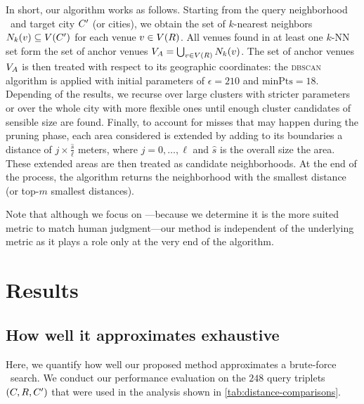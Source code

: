 In short, our algorithm works as follows. 
Starting from the query neighborhood \region\ and target city ${C}'$
(or cities), 
we obtain the set of $k$-nearest neighbors
${N}_k({v})\subseteq{V}({C}')$
for each venue ${v}\in{V}({R})$.
All venues found in at least one $k$-NN set form the set of anchor
venues 
${V}_A=\bigcup_{{v}\in{V}({R})}{N}_k({v})$.
The set of anchor venues ${V}_A$ is then treated with respect to its
geographic coordinates: the \textsc{dbscan} algorithm is applied with initial
parameters of $\epsilon=210$ and $\mathrm{minPts}=18$.
Depending of the results, we recurse over large clusters with
stricter parameters or over the whole city with more flexible ones until enough
cluster candidates of sensible size are found.
Finally, to account for misses that may happen during the pruning phase, each
area considered is extended by adding to its boundaries a distance of $j\times
\frac{\hat{s}}{\ell}$ meters, where $j=0,\ldots,\ell$ and $\hat{s}$ is the
overall size the area. These extended areas are then treated as candidate
neighborhoods. At the end of the process, the algorithm returns the
neighborhood with the smallest distance (or top-$m$ smallest distances).

Note that although we focus on \emd{}---because we determine it is the more
suited metric to match human judgment---our method is independent of the
underlying metric as it plays a role only at the very end of the algorithm.
\fi

\section{Results}
\label{sec:app-result}
\subsection{How well it approximates exhaustive \emd{}}


Here, we quantify how well our proposed method
approximates a brute-force \emd\ search. 
We conduct our performance evaluation on the $248$ query
triplets $({C}, {R}, {C}')$ that were used in the analysis
shown in \autoref{tab:distance-comparisons}.

